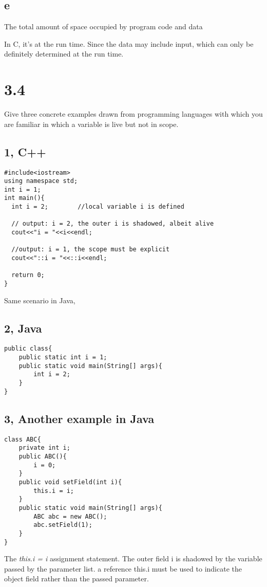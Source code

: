 \documentclass[a4paper, 11pt]{article}
\begin{document}
\subsection{e}The total amount of space occupied by program code and data

In C, it's at the run time. Since the data may include input, which can only be
definitely determined at the run time.

\pagebreak

\section{3.4}
Give three concrete examples drawn from programming languages with which you are
familiar in which a variable is live but not in scope.

\subsection{1, C++}
\begin{lstlisting}
#include<iostream>
using namespace std;
int i = 1;
int main(){
  int i = 2;		//local variable i is defined
  
  // output: i = 2, the outer i is shadowed, albeit alive
  cout<<"i = "<<i<<endl;  
  
  //output: i = 1, the scope must be explicit
  cout<<"::i = "<<::i<<endl; 
  
  return 0;	
}
\end{lstlisting}

Same scenario in Java, 
\subsection{2, Java}
\begin{lstlisting}
public class{
	public static int i = 1;
	public static void main(String[] args){
		int i = 2;
	}
}
\end{lstlisting}

\subsection{3, Another example in Java}
\begin{lstlisting}
class ABC{
	private int i;
	public ABC(){
		i = 0;
	}
	public void setField(int i){
		this.i = i;
	}
	public static void main(String[] args){
		ABC abc = new ABC();
		abc.setField(1);
	}
}
\end{lstlisting}

The \textit{this.i = i} assignment statement. The outer field i is shadowed by
the variable passed by the parameter list. a reference this.i must be used to
indicate the object field rather than the passed parameter. 
\end{document}
